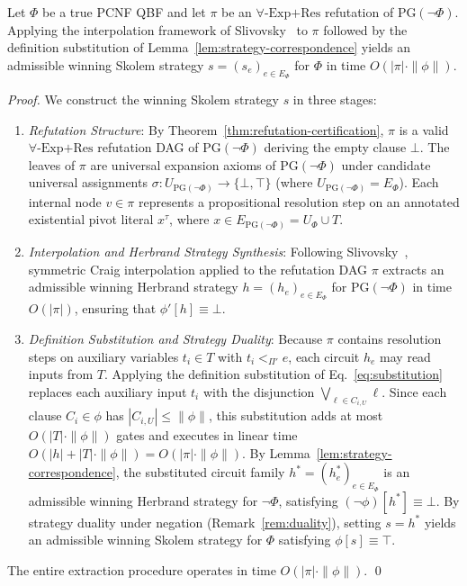 \documentclass[runningheads]{llncs}
\newcommand{\Bool}{\{\bot,\top\}}
\newcommand{\ExpRes}{\forall\text{-}\mathrm{Exp}\text{+}\mathrm{Res}}
\newcommand{\PG}{\mathrm{PG}}
\begin{document}
\begin{theorem}
    \label{thm:skolem-extraction}
    Let $\Phi$ be a true PCNF QBF and let $\pi$ be an $\ExpRes$ refutation of $\PG(\neg\Phi)$.
    Applying the interpolation framework of Slivovsky~\cite{slivovsky2024} to $\pi$ followed by the definition substitution of Lemma~\ref{lem:strategy-correspondence} yields an admissible winning Skolem strategy $s = (s_e)_{e \in E_\Phi}$ for $\Phi$ in time $O(|\pi| \cdot \|\phi\|)$.
\end{theorem}
\begin{proof}
    We construct the winning Skolem strategy $s$ in three stages:
    \begin{enumerate}
        \item \emph{Refutation Structure}:
              By Theorem~\ref{thm:refutation-certification}, $\pi$ is a valid $\ExpRes$ refutation DAG of $\PG(\neg\Phi)$ deriving the empty clause $\bot$.
              The leaves of $\pi$ are universal expansion axioms of $\PG(\neg\Phi)$ under candidate universal assignments $\sigma : U_{\PG(\neg\Phi)} \to \Bool$ (where $U_{\PG(\neg\Phi)} = E_\Phi$).
              Each internal node $v \in \pi$ represents a propositional resolution step on an annotated existential pivot literal $x^\tau$, where $x \in E_{\PG(\neg\Phi)} = U_\Phi \cup T$.
        \item \emph{Interpolation and Herbrand Strategy Synthesis}:
              Following Slivovsky~\cite{slivovsky2024}, symmetric Craig interpolation applied to the refutation DAG $\pi$ extracts an admissible winning Herbrand strategy $h = (h_e)_{e \in E_\Phi}$ for $\PG(\neg\Phi)$ in time $O(|\pi|)$, ensuring that $\phi'[h] \equiv \bot$.
        \item \emph{Definition Substitution and Strategy Duality}:
              Because $\pi$ contains resolution steps on auxiliary variables $t_i \in T$ with $t_i <_{\Pi'} e$, each circuit $h_e$ may read inputs from $T$.
              Applying the definition substitution of Eq.~\eqref{eq:substitution} replaces each auxiliary input $t_i$ with the disjunction $\bigvee_{\ell \in C_{i,U}} \ell$.
              Since each clause $C_i \in \phi$ has $|C_{i,U}| \le \|\phi\|$, this substitution adds at most $O(|T| \cdot \|\phi\|)$ gates and executes in linear time $O(|h| + |T| \cdot \|\phi\|) = O(|\pi| \cdot \|\phi\|)$.
              By Lemma~\ref{lem:strategy-correspondence}, the substituted circuit family $h^* = (h_e^*)_{e \in E_\Phi}$ is an admissible winning Herbrand strategy for $\neg\Phi$, satisfying $(\neg\phi)[h^*] \equiv \bot$.
              By strategy duality under negation (Remark~\ref{rem:duality}), setting $s = h^*$ yields an admissible winning Skolem strategy for $\Phi$ satisfying $\phi[s] \equiv \top$.
    \end{enumerate}
    The entire extraction procedure operates in time $O(|\pi| \cdot \|\phi\|)$.
    \qed
\end{proof}
\end{document}
